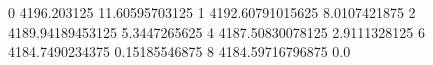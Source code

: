 0 4196.203125 11.60595703125
1 4192.60791015625 8.0107421875
2 4189.94189453125 5.3447265625
4 4187.50830078125 2.9111328125
6 4184.7490234375 0.15185546875
8 4184.59716796875 0.0
